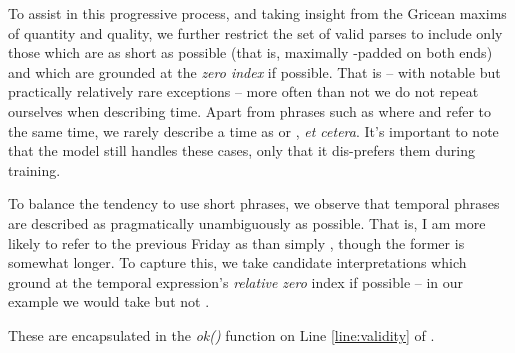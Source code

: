 To assist in this progressive process, and taking insight from the Gricean 
	maxims of quantity and quality, we further restrict the set of valid 
	parses to include only those which are as short as possible
	(that is, maximally -padded on both ends) and which are grounded
	at the \textit{zero index} if possible.
That is -- with notable but practically relatively rare exceptions --
	more often than not we do not repeat ourselves when describing time.
Apart from phrases such as  where 
	and  refer to the same time, we rarely describe a time as
	 or , \textit{et cetera}.
It's important to note that the model still handles these cases, only that it
	dis-prefers them during training.

To balance the tendency to use short phrases, we observe that
	temporal phrases are described as pragmatically unambiguously as possible.
That is, I am more likely to refer to the previous Friday as 
	than simply , though the former is somewhat longer.
To capture this, we take candidate interpretations which ground at the
	temporal expression's \textit{relative zero} index if possible --
	in our example we would take  but not .

These are encapsulated in the \textit{ok()} function
	on Line \ref{line:validity} of .

